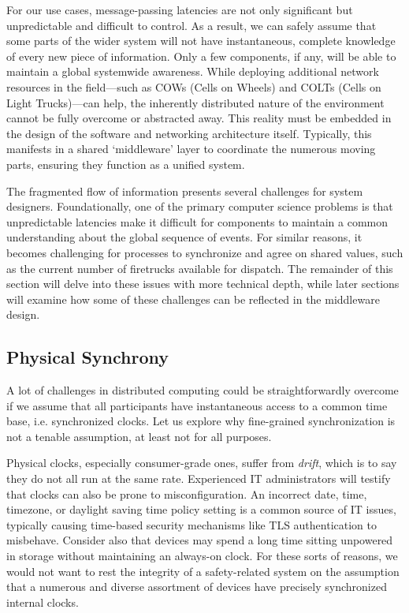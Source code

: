 \documentclass[]             %
{NASA}                       %
\theoremstyle{definition}
\begin{document}
For our use cases, message-passing latencies are not only significant
but unpredictable and difficult to control. As a result, we can safely
assume that some parts of the wider system will not have
instantaneous, complete knowledge of every new piece of
information. Only a few components, if any, will be able to maintain a
global systemwide awareness. While deploying additional network
resources in the field—such as COWs (Cells on Wheels) and COLTs (Cells
on Light Trucks)—can help, the inherently distributed nature of the
environment cannot be fully overcome or abstracted away. This reality
must be embedded in the design of the software and networking
architecture itself. Typically, this manifests in a shared
`middleware' layer to coordinate the numerous moving parts, ensuring
they function as a unified system.

The fragmented flow of information presents several challenges for
system designers. Foundationally, one of the primary computer science
problems is that unpredictable latencies make it difficult for
components to maintain a common understanding about the global
sequence of events. For similar reasons, it becomes challenging for
processes to synchronize and agree on shared values, such as the
current number of firetrucks available for dispatch. The remainder of
this section will delve into these issues with more technical depth,
while later sections will examine how some of these challenges can be
reflected in the middleware design.

\subsection{Physical Synchrony}
\label{ssec:physical-synchrony}
A lot of challenges in distributed computing could be
straightforwardly overcome if we assume that all participants have
instantaneous access to a common time base, i.e.  synchronized
clocks. Let us explore why fine-grained synchronization is not a
tenable assumption, at least not for all purposes.

Physical clocks, especially consumer-grade ones, suffer from
\emph{drift}, which is to say they do not all run at the same
rate. Experienced IT administrators will testify that clocks can also
be prone to misconfiguration. An incorrect date, time, timezone, or
daylight saving time policy setting is a common source of IT issues,
typically causing time-based security mechanisms like TLS
authentication \citationneeded to misbehave. Consider also that
devices may spend a long time sitting unpowered in storage without
maintaining an always-on clock. For these sorts of reasons, we would
not want to rest the integrity of a safety-related system on the
assumption that a numerous and diverse assortment of devices have
precisely synchronized internal clocks.
\end{document}
